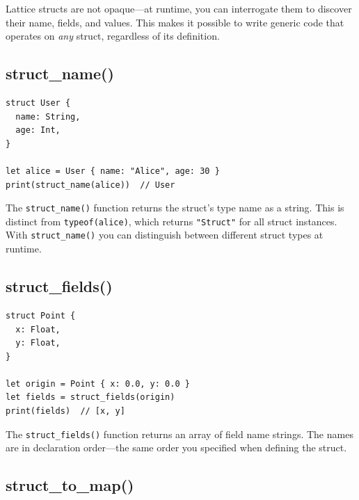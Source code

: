 
Lattice structs are not opaque---at runtime, you can interrogate them to discover their name, fields, and values.
This makes it possible to write generic code that operates on \emph{any} struct, regardless of its definition.

\subsection{struct\_name()}

\begin{lstlisting}[language=Lattice, caption={Getting a struct's type name}]
struct User {
  name: String,
  age: Int,
}

let alice = User { name: "Alice", age: 30 }
print(struct_name(alice))  // User
\end{lstlisting}

The \lstinline|struct_name()| function returns the struct's type name as a string.
This is distinct from \lstinline|typeof(alice)|, which returns \lstinline|"Struct"| for all struct instances.
With \lstinline|struct_name()| you can distinguish between different struct types at runtime.

\subsection{struct\_fields()}

\begin{lstlisting}[language=Lattice, caption={Listing a struct's field names}]
struct Point {
  x: Float,
  y: Float,
}

let origin = Point { x: 0.0, y: 0.0 }
let fields = struct_fields(origin)
print(fields)  // [x, y]
\end{lstlisting}

The \lstinline|struct_fields()| function returns an array of field name strings.
The names are in declaration order---the same order you specified when defining the struct.

\subsection{struct\_to\_map()}


